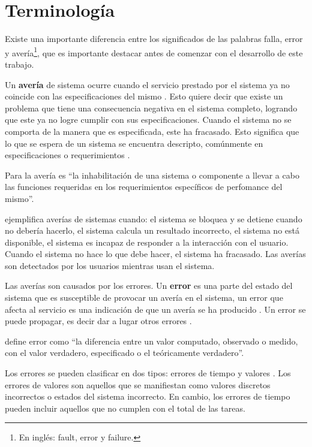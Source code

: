 \section{Terminología}\label{sec:terminologia}
Existe una importante diferencia entre los significados de las palabras falla, error y
avería\footnote{En inglés: fault, error y failure.}, que es importante destacar antes de comenzar
con el desarrollo de este trabajo.

Un \textbf{avería} de sistema ocurre cuando el servicio prestado por el sistema ya no coincide con
las especificaciones del mismo \citep{Hanmer07}. Esto quiere decir que existe un problema que tiene
una consecuencia negativa en el sistema completo, logrando que este ya no logre cumplir con sus
especificaciones. Cuando el sistema no se comporta de la manera que es especificada, este ha
fracasado. Esto significa que lo que se espera de un sistema se encuentra descripto, comúnmente en
especificaciones o requerimientos \citep{Pullum01}.

Para la \cite{IEEE610.12} avería es ``la inhabilitación de una sistema o componente a llevar a
cabo las funciones requeridas en los requerimientos específicos de perfomance del mismo''.

\cite{Hanmer07} ejemplifica averías de sistemas cuando: el sistema se bloquea y se detiene cuando no
debería hacerlo, el sistema calcula un resultado incorrecto, el sistema no está disponible, el
sistema es incapaz de responder a la interacción con el usuario. Cuando el sistema no hace lo que
debe hacer, el sistema ha fracasado. Las averías son detectados por los usuarios mientras usan el
sistema.

Las averías son causados por los errores. Un \textbf{error} es una parte del estado del sistema
que es susceptible de provocar un avería en el sistema, un error que afecta al servicio es una
indicación de que un avería se ha producido \citep{Hanmer07}. Un error se puede propagar, es decir
dar a lugar otros errores \citep{Pullum01}.

\cite{IEEE610.12} define error como ``la diferencia entre un valor computado, observado o medido,
con el valor verdadero, especificado o el teóricamente verdadero''.

Los errores se pueden clasificar en dos tipos: errores de tiempo y valores \citep{Hanmer07}. Los
errores de valores son aquellos que se manifiestan como valores discretos incorrectos o estados del
sistema incorrecto. En cambio, los errores de tiempo pueden incluir aquellos que no cumplen con el total de las tareas.

